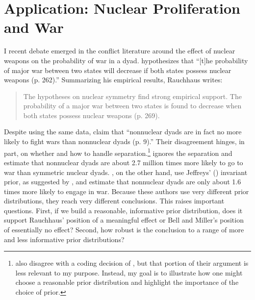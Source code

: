 \documentclass[12pt]{article}
\begin{document}
\section*{Application: Nuclear Proliferation and War}

I recent debate emerged in the conflict literature around the effect of nuclear weapons on the probability of war in a dyad. \cite{Rauchhaus2009} hypothesizes that ``[t]he probability of major war between two states will decrease if both states possess nuclear weapons (p. 262).'' Summarizing his empirical results, Rauchhaus writes:

\begin{quote} 
The hypotheses on nuclear symmetry find strong empirical support. The probability of a major war between two states is found to decrease when both states possess nuclear weapons (p. 269).
\end{quote}

Despite using the same data, \cite{BellMiller2014} claim that ``nonnuclear dyads are in fact no more likely to fight wars than nonnuclear dyads (p. 9).'' Their disagreement hinges, in part, on whether and how to handle separation.\footnote{\cite{BellMiller2014} also disagree with a coding decision of \cite{Rauchhaus2009}, but that portion of their argument is less relevant to my purpose. Instead, my goal is to illustrate how one might choose a reasonable prior distribution and highlight the importance of the choice of prior.} \cite{Rauchhaus2009} ignores the separation and estimate that nonnuclear dyads are about 2.7 million times more likely to go to war than symmetric nuclear dyads. \cite{BellMiller2014}, on the other hand, use Jeffreys' (\citeyear{1946}) invariant prior, as suggested by \cite{Zorn2005}, and estimate that nonnuclear dyads are only about 1.6 times more likely to engage in war. Because these authors use very different prior distributions, they reach very different conclusions. This raises important questions. First, if we build a reasonable, informative prior distribution, does it support Rauchhaus' position of a meaningful effect or Bell and Miller's position of essentially no effect? Second, how robust is the conclusion to a range of more and less informative prior distributions?
\end{document}
